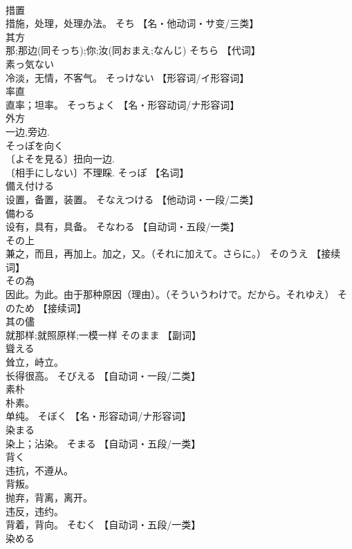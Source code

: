 \documentclass[8pt]{extreport}
\begin{document}
\begin{CJK}{UTF8}{min}
\\	措置	
\\	措施，处理，处理办法。	そち		【名・他动词・サ变/三类】
\\	其方	
\\	那;那边(同そっち);你;汝(同おまえ;なんじ)	そちら		【代词】
\\	素っ気ない	
\\	冷淡，无情，不客气。	そっけない		【形容词/イ形容词】
\\	率直	
\\	直率；坦率。	そっちょく		【名・形容动词/ナ形容词】
\\	外方	
\\	一边,旁边. 
\\	そっぽを向く 
\\	〔よそを見る〕扭向一边. 
\\	〔相手にしない〕不理睬.	そっぽ		【名词】
\\	備え付ける	
\\	设置，备置，装置。	そなえつける		【他动词・一段/二类】
\\	備わる	
\\	设有，具有，具备。	そなわる		【自动词・五段/一类】
\\	その上	
\\	兼之，而且，再加上。加之，又。（それに加えて。さらに。）	そのうえ		【接续词】
\\	その為	
\\	因此。为此。由于那种原因（理由）。（そういうわけで。だから。それゆえ）	そのため		【接续词】
\\	其の儘	
\\	就那样;就照原样;一模一样	そのまま		【副词】
\\	聳える	
\\	耸立，峙立。 
\\	长得很高。	そびえる		【自动词・一段/二类】
\\	素朴	
\\	朴素。 
\\	单纯。	そぼく		【名・形容动词/ナ形容词】
\\	染まる	
\\	染上；沾染。	そまる		【自动词・五段/一类】
\\	背く	
\\	违抗，不遵从。 
\\	背叛。 
\\	抛弃，背离，离开。 
\\	违反，违约。 
\\	背着，背向。	そむく		【自动词・五段/一类】
\\	染める	

\end{CJK}
\end{document}
